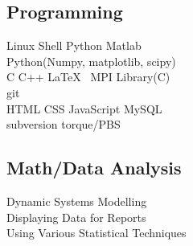 \documentclass[]{deedy-resume-openfont}
\begin{document}
\begin{minipage}[t]{0.33\textwidth}
\subsection{Programming}
 Linux Shell \textbullet{} Python \textbullet{} Matlab\\
 Python(Numpy, matplotlib, scipy) \\
C \textbullet{} C++ \textbullet{} \LaTeX\ \textbullet{} MPI Library(C) \\
git\\
HTML\textbullet{} CSS \textbullet{} JavaScript \textbullet{} MySQL\\
subversion \textbullet{} torque/PBS
\sectionsep
\subsection{Math/Data Analysis}
Dynamic Systems Modelling \\
Displaying Data for Reports\\
Using Various Statistical Techniques
%
%

\end{minipage} 
\end{document}
